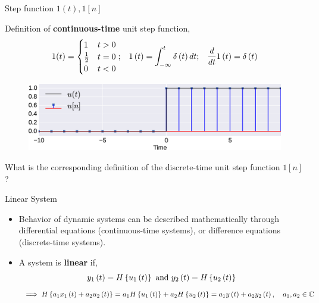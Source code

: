 \documentclass[aspectratio=169]{beamer}
\def\lp{\ensuremath\left(}
\def\rp{\ensuremath\right)}
\def\lc{\ensuremath\left\{}
\def\rc{\ensuremath\right\}}
\begin{document}
\begin{frame}{Step function $1(t), 1[n]$}

Definition of \textbf{continuous-time} unit step function,
\[ 1(t) = \begin{cases}
1 & t > 0\\
\frac{1}{2} & t = 0\\
0 & t < 0
\end{cases}; \,\,\,\,\, 1\lp t\rp = \int_{-\infty}^{t} \delta\lp t\rp dt; \,\,\,\,\,  \frac{d}{dt}1\lp t\rp = \delta\lp t\rp\]

\begin{figure}
\includegraphics[width=\textwidth]{img/step.eps}
\end{figure}

What is the corresponding definition of the discrete-time unit step function $1[n]$?
\end{frame}


\begin{frame}{Linear System}
\begin{center}
\end{center}
\begin{itemize}
    \item Behavior of dynamic systems can be described mathematically through differential equations (continuous-time systems), or difference equations (discrete-time systems).
    \item A system is \textbf{linear} if, 
    \[ y_1\lp t\rp = H\lc u_1\lp t\rp\rc \text{ and } y_2\lp t\rp = H\lc u_2 \lp t\rp \rc\]
    \[ \implies H\lc a_1x_1\lp t\rp + a_2u_2\lp t\rp \rc = a_1H\lc u_1\lp t\rp\rc + a_2H\lc u_2\lp t\rp \rc = a_1y\lp t\rp + a_2y_2\lp t\rp, \quad a_1, a_2 \in \mathbb{C} \]
\end{itemize}
\end{frame}
\end{document}
